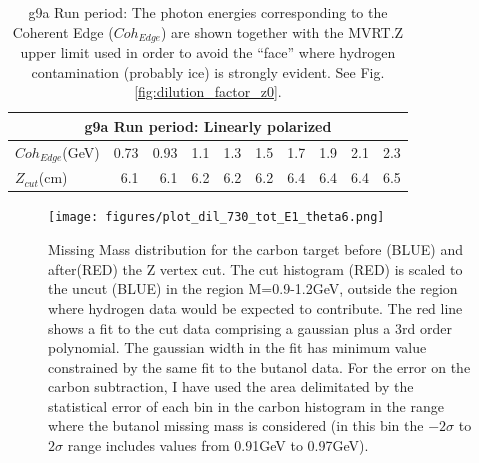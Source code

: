 \begin{table}
  \begin{center}
    \begin{tabular}{ ||l|r|r|r|r|r|r|r|r|r||}
      \hline
      \multicolumn{10}{|c|}{g9a Run period: Linearly polarized } \\
      \hline
      $Coh_{Edge}$(GeV)&0.73&0.93&1.1&1.3&1.5&1.7&1.9&2.1&2.3 \\
      \hline
      $Z_{cut}$(cm)&6.1&6.1&6.2&6.2&6.2&6.4&6.4&6.4&6.5 \\
      \hline
    \end{tabular}
  \end{center}
  \caption{g9a Run period: The photon energies corresponding to the Coherent Edge ($Coh_{Edge}$) are shown together with the MVRT.Z upper limit used in order to avoid the ``face'' where hydrogen contamination (probably ice) is strongly evident. See Fig. \ref{fig:dilution_factor_z0}.}
  \label{table:dil_factor_zcut}
\end{table}

\begin{figure}[H]
  \begin{center}
    \texttt{[image: figures/plot\_dil\_730\_tot\_E1\_theta6.png]} \\
    \caption{Missing Mass distribution for the carbon target before (BLUE) and after(RED) the Z vertex cut. The cut histogram (RED) is scaled to the uncut (BLUE) in the region M=0.9-1.2GeV, outside the region where hydrogen data would be expected to contribute. The red line shows a fit to the cut data comprising a gaussian plus a 3rd order polynomial. The gaussian width in the fit has minimum value constrained by the same fit to the butanol data.  
 For the error on the carbon subtraction, I have used the area delimitated by the statistical error of each bin in the carbon histogram in the range where the butanol missing mass is considered (in this bin the $-2\sigma$ to $2\sigma$ range includes values from 0.91GeV to 0.97GeV).}
    \label{fig:dilution_mass_zcut}
  \end{center}
\end{figure}


